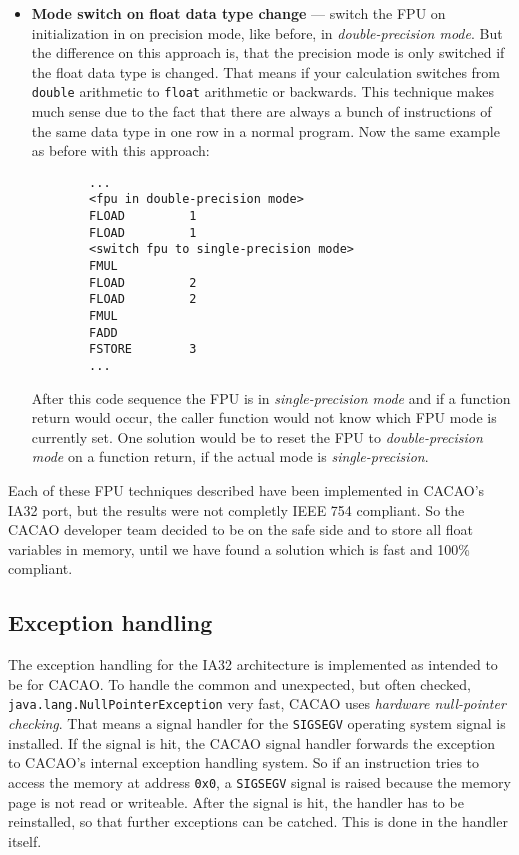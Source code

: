 \begin{itemize}
 \item \textbf{Mode switch on float data type change} --- switch the
 FPU on initialization in on precision mode, like before, in
 \textit{double-precision mode}. But the difference on this approach
 is, that the precision mode is only switched if the float data type
 is changed. That means if your calculation switches from
 \texttt{double} arithmetic to \texttt{float} arithmetic or
 backwards. This technique makes much sense due to the fact that there
 are always a bunch of instructions of the same data type in one row
 in a normal program. Now the same example as before with this
 approach:

 \begin{verbatim}
        ...
        <fpu in double-precision mode>
        FLOAD         1
        FLOAD         1
        <switch fpu to single-precision mode>
        FMUL         
        FLOAD         2
        FLOAD         2
        FMUL         
        FADD         
        FSTORE        3
        ...
 \end{verbatim}

 After this code sequence the FPU is in \textit{single-precision mode}
 and if a function return would occur, the caller function would not
 know which FPU mode is currently set. One solution would be to reset
 the FPU to \textit{double-precision mode} on a function return, if
 the actual mode is \textit{single-precision}.
\end{itemize}

Each of these FPU techniques described have been implemented in
CACAO's IA32 port, but the results were not completly IEEE 754
compliant. So the CACAO developer team decided to be on the safe side
and to store all float variables in memory, until we have found a
solution which is fast and 100\% compliant.


\subsection{Exception handling}

The exception handling for the IA32 architecture is implemented as
intended to be for CACAO. To handle the common and unexpected, but
often checked, \texttt{java.lang.NullPointerException} very fast,
CACAO uses \textit{hardware null-pointer checking}. That means a
signal handler for the \texttt{SIGSEGV} operating system signal is
installed. If the signal is hit, the CACAO signal handler forwards the
exception to CACAO's internal exception handling system. So if an
instruction tries to access the memory at address \texttt{0x0}, a
\texttt{SIGSEGV} signal is raised because the memory page is not read
or writeable. After the signal is hit, the handler has to be
reinstalled, so that further exceptions can be catched. This is done
in the handler itself.

